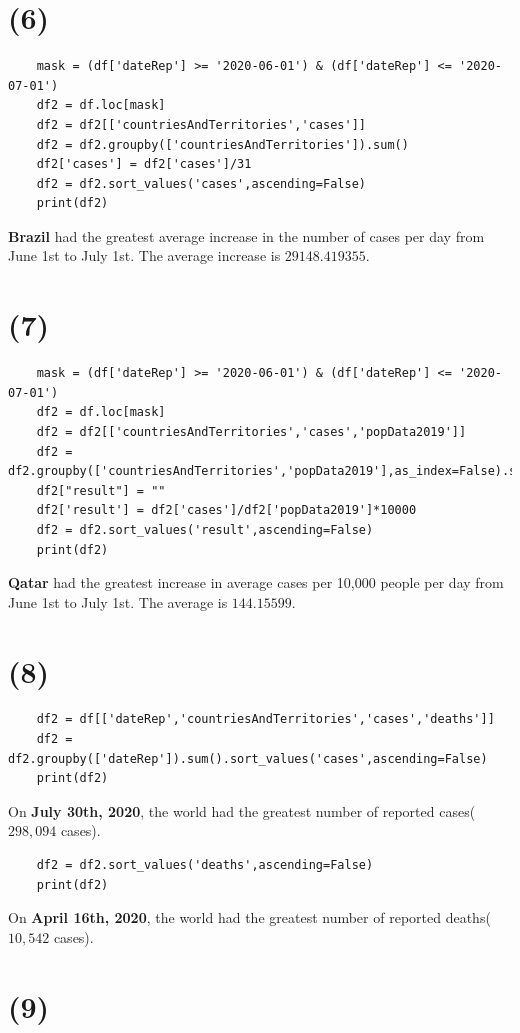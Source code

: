 \documentclass[12pt]{article}
\begin{document}
\section*{(6)}
\begin{lstlisting}
    mask = (df['dateRep'] >= '2020-06-01') & (df['dateRep'] <= '2020-07-01')
    df2 = df.loc[mask]
    df2 = df2[['countriesAndTerritories','cases']]
    df2 = df2.groupby(['countriesAndTerritories']).sum()
    df2['cases'] = df2['cases']/31
    df2 = df2.sort_values('cases',ascending=False)
    print(df2)
\end{lstlisting}
\textbf{Brazil} had the greatest average increase in the number of cases per day from June 1st to July 1st. The average increase is $29148.419355$.

\section*{(7)}
\begin{lstlisting}
    mask = (df['dateRep'] >= '2020-06-01') & (df['dateRep'] <= '2020-07-01')
    df2 = df.loc[mask]
    df2 = df2[['countriesAndTerritories','cases','popData2019']]
    df2 = df2.groupby(['countriesAndTerritories','popData2019'],as_index=False).sum()
    df2["result"] = ""
    df2['result'] = df2['cases']/df2['popData2019']*10000
    df2 = df2.sort_values('result',ascending=False)
    print(df2)
\end{lstlisting}
\textbf{Qatar} had the greatest increase in average cases per 10,000 people per day from June 1st to July 1st. The average is $144.15599$.

\section*{(8)}
\begin{lstlisting}
    df2 = df[['dateRep','countriesAndTerritories','cases','deaths']]
    df2 = df2.groupby(['dateRep']).sum().sort_values('cases',ascending=False)
    print(df2)
\end{lstlisting}
On \textbf{July 30th, 2020}, the world had the greatest number of reported cases($298,094$ cases).
\begin{lstlisting}
    df2 = df2.sort_values('deaths',ascending=False)
    print(df2)
\end{lstlisting}
On \textbf{April 16th, 2020}, the world had the greatest number of reported deaths($10,542$ cases).


\section*{(9)}
\end{document}
